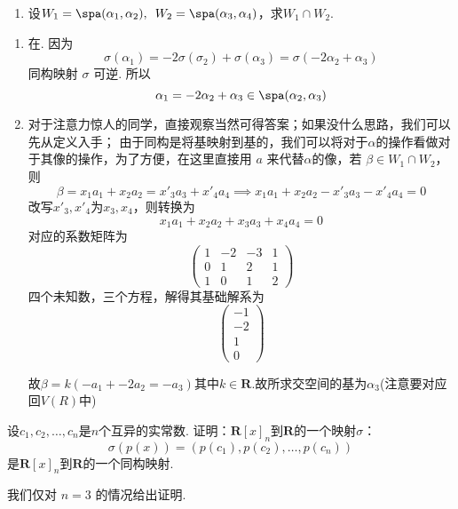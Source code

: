 \begin{exercise}
\begin{exgroup}
\begin{enumerate}
            \item 设$W_1=\spa(\alpha_1,\alpha_2),\enspace W_2=\spa(\alpha_3,\alpha_4)$，求$W_1\cap W_2$.
        \end{enumerate}

        \begin{answer}
            \begin{enumerate}
                \item 在. 因为
                      \[ \sigma(\alpha_1) = -2 \sigma(\sigma_2) + \sigma(\alpha_3) = \sigma(-2 \alpha_2 + \alpha_3) \]
                      同构映射 $ \sigma $ 可逆. 所以
                      \[ \alpha_1 = -2 \alpha_2 + \alpha_3 \in \spa(\alpha_2, \alpha_3) \]
                \item 对于注意力惊人的同学，直接观察当然可得答案；如果没什么思路，我们可以先从定义入手；
                由于同构是将基映射到基的，我们可以将对于$\alpha$的操作看做对于其像的操作，为了方便，在这里直接用 $a$ 来代替$\alpha$的像，若 $\beta \in W_1\cap W_2$，则
                \[ \beta = x_1 a_1+x_2 a_2=x'_3 a_3+x'_4 a_4 \implies  x_1 a_1+x_2 a_2-x'_3 a_3-x'_4 a_4 = 0 \]
                改写$x'_3,x'_4$为$x_3,x_4$，则转换为
                \[ x_1 a_1+x_2 a_2+x_3 a_3+x_4 a_4 = 0 \]
                对应的系数矩阵为
                \[ \begin{pmatrix}
                    1 & -2 & -3 & 1 \\
                    0 & 1 & 2 & 1\\
                    1 & 0 & 1 & 2
                \end{pmatrix} \]
                四个未知数，三个方程，解得其基础解系为
                \[ \begin{pmatrix}
                    -1 \\
                    -2 \\
                    1 \\
                    0
                \end{pmatrix} \]

                故$\beta = k(-a_1+-2a_2=-a_3)$其中$k\in \mathbf{R}$.故所求交空间的基为$\alpha_3$(注意要对应回$V(R)$中)
            \end{enumerate}
        \end{answer}

        \item 设$c_1,c_2,\ldots,c_n$是$n$个互异的实常数. 证明：$\mathbf{R}[x]_n$到$\mathbf{R}$的一个映射$\sigma$：
        \[\sigma(p(x))=(p(c_1),p(c_2),\ldots,p(c_n))\]
        是$\mathbf{R}[x]_n$到$\mathbf{R}$的一个同构映射.
        \begin{answer}
            我们仅对 $ n = 3 $ 的情况给出证明. %


\end{answer}
\end{exgroup}
\end{exercise}
